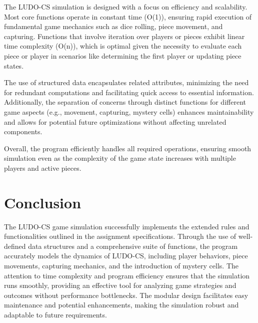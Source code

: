 \documentclass{article}
\begin{document}
        The LUDO-CS simulation is designed with a focus on efficiency and scalability. Most core functions operate in constant time (O(1)), ensuring rapid execution of fundamental game mechanics such as dice rolling, piece movement, and capturing. Functions that involve iteration over players or pieces exhibit linear time complexity (O(n)), which is optimal given the necessity to evaluate each piece or player in scenarios like determining the first player or updating piece states.
        
        The use of structured data encapsulates related attributes, minimizing the need for redundant computations and facilitating quick access to essential information. Additionally, the separation of concerns through distinct functions for different game aspects (e.g., movement, capturing, mystery cells) enhances maintainability and allows for potential future optimizations without affecting unrelated components.
        
        Overall, the program efficiently handles all required operations, ensuring smooth simulation even as the complexity of the game state increases with multiple players and active pieces.
        
        \section{Conclusion}
        
        The LUDO-CS game simulation successfully implements the extended rules and functionalities outlined in the assignment specifications. Through the use of well-defined data structures and a comprehensive suite of functions, the program accurately models the dynamics of LUDO-CS, including player behaviors, piece movements, capturing mechanics, and the introduction of mystery cells. The attention to time complexity and program efficiency ensures that the simulation runs smoothly, providing an effective tool for analyzing game strategies and outcomes without performance bottlenecks. The modular design facilitates easy maintenance and potential enhancements, making the simulation robust and adaptable to future requirements.
        
        
\end{document}
